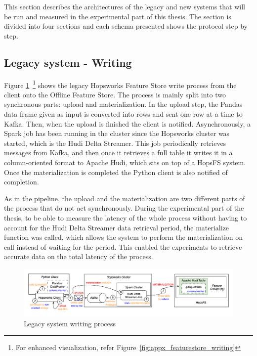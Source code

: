 This section describes the architectures of the legacy and new systems that will be run and measured in the experimental part of this thesis. The section is divided into four sections and each schema presented shows the protocol step by step.

\subsection{Legacy system - Writing}
\label{subsec:legacy_sys_writing}

Figure \ref{fig:featurestore_writing}~\footnote{For enhanced visualization, refer Figure~\ref{fig:appx_featurestore_writing}} shows the legacy Hopsworks Feature Store write process from the client onto the Offline Feature Store. The process is mainly split into two synchronous parts: upload and materialization. In the upload step, the Pandas data frame given as input is converted into rows and sent one row at a time to Kafka. Then, when the upload is finished the client is notified. Asynchronously, a Spark job has been running in the cluster since the Hopsworks cluster was started, which is the Hudi Delta Streamer. This job periodically retrieves messages from Kafka, and then once it retrieves a full table it writes it in a column-oriented format to Apache Hudi, which sits on top of a \gls{HopsFS} system. Once the materialization is completed the Python client is also notified of completion.

As in the pipeline, the upload and the materialization are two different parts of the process that do not act synchronously. During the experimental part of the thesis, to be able to measure the latency of the whole process without having to account for the Hudi Delta Streamer data retrieval period, the materialize function was called, which allows the system to perform the materialization on call instead of waiting for the period. This enabled the experiments to retrieve accurate data on the total latency of the process.

\begin{figure}
    \begin{center}
      \includegraphics[width=\textwidth]{figures/2-background/FeatureStore-writing.png}
    \end{center}
    \caption{Legacy system writing process}
    \label{fig:featurestore_writing}
\end{figure}

